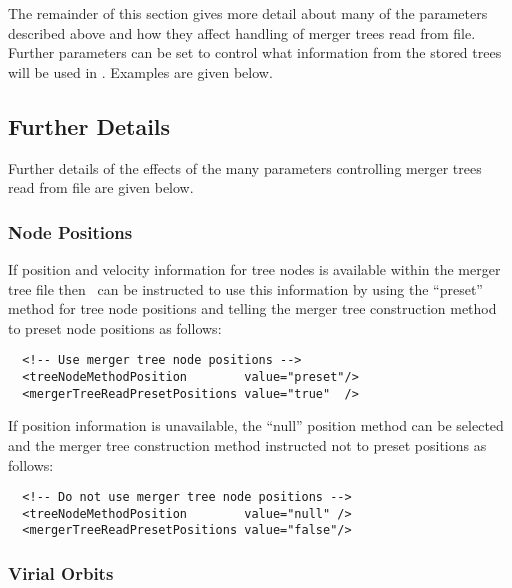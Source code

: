 The remainder of this section gives more detail about many of the parameters described above and how they affect handling of merger trees read from file. Further parameters can be set to control what information from the stored trees will be used in \glc. Examples are given below.

\subsection{Further Details}

Further details of the effects of the many parameters controlling merger trees read from file are given below.

\subsubsection{Node Positions}

If position and velocity information for tree nodes is available within the merger tree file then \glc\ can be instructed to use this information by using the ``preset'' method for tree node positions and telling the merger tree construction method to preset node positions as follows:
\begin{verbatim}
  <!-- Use merger tree node positions -->
  <treeNodeMethodPosition        value="preset"/>
  <mergerTreeReadPresetPositions value="true"  />
\end{verbatim}
If position information is unavailable, the ``null'' position method can be selected and the merger tree construction method instructed not to preset positions as follows:
\begin{verbatim}
  <!-- Do not use merger tree node positions -->
  <treeNodeMethodPosition        value="null" />
  <mergerTreeReadPresetPositions value="false"/>
\end{verbatim}

\subsubsection{Virial Orbits}

